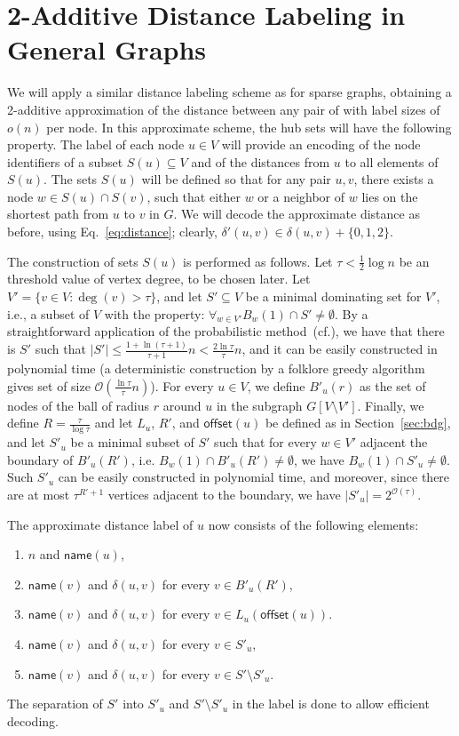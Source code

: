 \documentclass{article}[11pt,letter]
\newcommand{\bigo}{\mathcal{O}}
\newcommand{\symb}{R}
\newcommand{\offset}{\mathsf{offset}}
\newcommand{\name}{\mathsf{name}}
\newcommand{\cost}{\delta}
\newcommand{\da}{\delta'}
\begin{document}
\section{2-Additive Distance Labeling in General Graphs}\label{sec:general}

We will apply a similar distance labeling scheme as for sparse graphs, obtaining a 2-additive approximation of the distance between any pair of  with label sizes of $o(n)$ per node. In this approximate scheme, the hub sets will have the following property.  The label of each node $ u \in V$ will provide an encoding of the node identifiers of a subset $S(u) \subseteq V$ and of the distances from $u$ to all elements of $S(u)$. The sets $S(u)$ will be defined so that for any pair $u, v$, there exists a node $w \in S(u) \cap S(v)$, such that either $w$ or a neighbor of $w$ lies on the shortest path from $u$ to $v$ in $G$. We will decode the approximate distance as before, using Eq.~\eqref{eq:distance}; clearly, $\da (u, v) \in \cost (u, v) + \{0,1,2\}$.

The construction of sets $S(u)$ is performed as follows. Let $\tau < \frac{1}{2} \log n$ be an threshold value of vertex degree, to be chosen later. Let $V' = \{ v\in V : \deg(v)>\tau\}$, and let $S'\subseteq V$ be a minimal dominating set for $V'$, i.e., a subset of $V$ with the property: $\forall_{w\in V'} B_w(1) \cap S'\neq\emptyset$. By a straightforward application of the probabilistic method~(cf.\cite[proof of Theorem 1.2.2]{probmethod}), we have that there is $S'$ such that $|S'| \leq \frac{1+\ln(\tau+1)}{\tau+1} n < \frac{2\ln \tau}{\tau} n$, and it can be easily constructed in polynomial time (a deterministic construction by a folklore greedy algorithm gives set of size $\bigo(\frac{\ln \tau}{\tau} n)$). For every $u\in V$, we define $B'_u(r)$ as the set of nodes of the ball of radius $r$ around $u$ in the subgraph $G[V\setminus V']$.  Finally, we define $\symb = \frac{\tau}{\log \tau}$ and let $L_u$, $\symb'$, and $\offset(u)$ be defined as in Section~\ref{sec:bdg}, and let $S'_u$ be a minimal subset of $S'$ such that for every $w\in V'$ adjacent the boundary of $B'_u(\symb')$, i.e. $B_w(1) \cap B'_u(\symb') \neq \emptyset$, we have $B_w(1) \cap S'_u \neq \emptyset$. Such $S'_u$ can be easily constructed in polynomial time, and moreover, since there are at most $\tau^{R'+1}$ vertices adjacent to the boundary, we have $|S'_u| = 2^{\bigo(\tau)}$.

The approximate distance label of $u$ now consists of the following elements:
\begin{enumerate}
\item $n$ and $\name(u)$,
\item $\name(v)$ and $\cost(u,v)$ for every $v\in B'_u(\symb')$,
\item $\name(v)$ and $\cost(u,v)$ for every $v\in L_u(\offset(u))$.
\item $\name(v)$ and $\cost(u,v)$ for every $v\in S'_u$,
\item $\name(v)$ and $\cost(u,v)$ for every $v\in S' \setminus S'_u$.
\end{enumerate}
The separation of $S'$ into $S'_u$ and $S' \setminus S'_u$ in the label is done to allow
efficient decoding.
\end{document}
